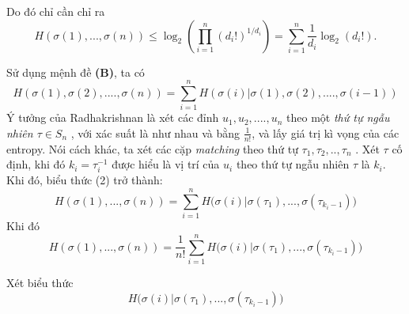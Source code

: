 \documentclass[a4paper]{report}
\begin{document}
Do đó chỉ cần chỉ ra
\begin{equation}
    H(\sigma(1),...,\sigma(n)) \leq \log_{2}(\prod_{i=1}^{n}(d_{i}!)^{1/d_{i}}) = \sum_{i=1}^{n}\frac{1}{d_{i}}\log_{2}(d_{i}!).
\end{equation}

Sử dụng mệnh đề \textbf{(B)}, ta có
\begin{equation}
H(\sigma (1), \sigma (2), ....  ,\sigma (n)) = \displaystyle \sum_{i=1}^{n}H(\sigma (i)| \sigma (1), \sigma (2), ....  ,\sigma (i-1))
\end{equation}
Ý tưởng của Radhakrishnan là xét các đỉnh  $u_{1}, u_{2}, ....  , u_{n}$ theo một \textit{thứ tự ngẫu nhiên $\tau \in S_{n}$} , với xác suất là như nhau và bằng $\frac{1}{n!}$, và lấy giá trị kì vọng của các entropy. Nói cách khác, ta xét các cặp \textit{matching} theo thứ tự $\tau_{1},\tau_{2},..,\tau_{n}$ . Xét $\tau$ cố định, khi đó $k_{i} = \tau ^{-1}_{i}$ được hiểu là vị trí của $u_{i}$ theo thứ tự ngẫu nhiên $\tau$ là $k_{i}$. Khi đó, biểu thức (2) trở thành:
\begin{equation*}
	H(\sigma(1),...,\sigma(n)) = \displaystyle \sum_{i=1}^{n}H\Big(\sigma (i)| \sigma (\tau_{1}),...,\sigma (\tau_{k_{i}-1})\Big)
\end{equation*}
Khi đó
\begin{equation*}
	H(\sigma(1),...,\sigma(n)) = \frac{1}{n!}\displaystyle \sum_{i=1}^{n}H\Big(\sigma (i)| \sigma (\tau_{1}),...,\sigma (\tau_{k_{i}-1})\Big)
\end{equation*}

Xét biểu thức 
\begin{equation}
H\Big(\sigma (i)| \sigma (\tau_{1}),...,\sigma (\tau_{k_{i}-1})\Big)
\end{equation}
\\
\end{document}
